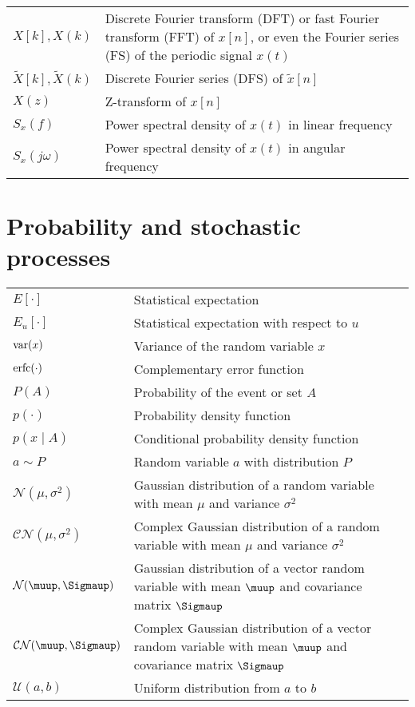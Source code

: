 \documentclass{article}
\begin{document}
\begin{xltabular}{\textwidth}{XX}
    \(X[k], X(k)\) & Discrete Fourier transform (DFT) or fast Fourier transform (FFT) of \(x[n]\), or even the Fourier series (FS) of the periodic signal \(x(t)\)\\
    \(\tilde{X}[k], \tilde{X}(k)\) & Discrete Fourier series (DFS) of \(\tilde{x}[n]\)\\
    \(X(z)\) & Z-transform of \(x[n]\)\\
    \(S_x(f)\) & Power spectral density of \(x(t)\) in linear frequency\\
    \(S_x(j\omega)\) & Power spectral density of \(x(t)\) in angular frequency
\end{xltabular}

\section{Probability and stochastic processes}
\begin{xltabular}{\textwidth}{XX}
    \(E\left[ \cdot \right]\) & Statistical expectation\\
    \(E_u\left[ \cdot \right]\) & Statistical expectation with respect to \(u\)\\
    \(\textnormal{var}(x)\) & Variance of the random variable \(x\)\\
    \(\textnormal{erfc}(\cdot)\) & Complementary error function\\
    \(P(A)\) & Probability of the event or set \(A\)\\
    \(p(\cdot)\) & Probability density function\\
    \(p(x\mid A)\) & Conditional probability density function\\
    \(a\sim P\) & Random variable \(a\) with distribution \(P\)\\
    \(\mathcal{N}(\mu, \sigma^2)\) & Gaussian distribution of a random variable with mean \(\mu\) and variance \(\sigma^{2}\)\\
    \(\mathcal{CN}(\mu, \sigma^2)\) & Complex Gaussian distribution of a random variable with mean \(\mu\) and variance \(\sigma^{2}\)\\
    \(\mathcal{N}(\boldsymbol{\muup}, \boldsymbol{\Sigmaup})\) & Gaussian distribution of a vector random variable with mean \(\boldsymbol{\muup}\) and covariance matrix \(\boldsymbol{\Sigmaup}\)\\
    \(\mathcal{CN}(\boldsymbol{\muup}, \boldsymbol{\Sigmaup})\) & Complex Gaussian distribution of a vector random variable with mean \(\boldsymbol{\muup}\) and covariance matrix \(\boldsymbol{\Sigmaup}\)\\
    \(\mathcal{U}(a,b)\) & Uniform distribution from \(a\) to \(b\)
\end{xltabular}
\end{document}
